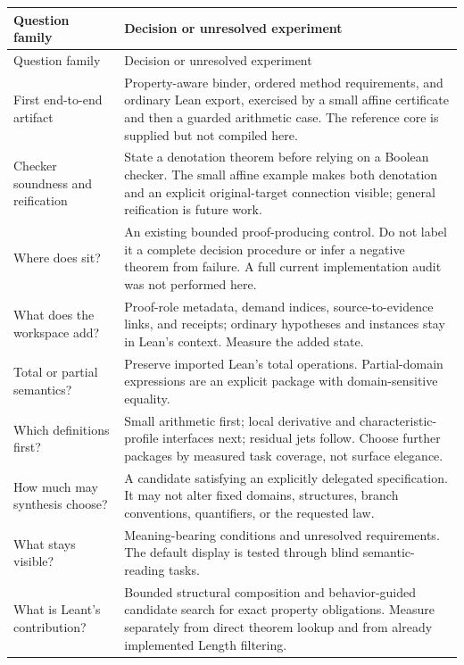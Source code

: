 \documentclass[11pt,a4paper]{article}
\newcommand{\code}[1]{\texttt{\detokenize{#1}}}
\theoremstyle{definition}
\begin{document}
\begin{center}\small
\begin{longtable}{@{}P{42mm}P{111mm}@{}}
\toprule
Question family & Decision or unresolved experiment\\
\midrule\endfirsthead
\toprule Question family & Decision or unresolved experiment\\\midrule\endhead
\bottomrule\endfoot
First end-to-end artifact & Property-aware binder, ordered method requirements,
and ordinary Lean export, exercised by a small affine certificate and then a
guarded arithmetic case. The reference core is supplied but not compiled here.\\
Checker soundness and reification & State a denotation theorem before relying
on a Boolean checker. The small affine example makes both denotation and an
explicit original-target connection visible; general reification is future work.\\
Where does \code{grobner} sit? & An existing bounded proof-producing control.
Do not label it a complete decision procedure or infer a negative theorem from
failure. A full current implementation audit was not performed here.\\
What does the workspace add? & Proof-role metadata, demand indices,
source-to-evidence links, and receipts; ordinary hypotheses and instances stay
in Lean's context. Measure the added state.\\
Total or partial semantics? & Preserve imported Lean's total operations.
Partial-domain expressions are an explicit package with domain-sensitive equality.\\
Which definitions first? & Small arithmetic first; local derivative and
characteristic-profile interfaces next; residual jets follow. Choose further
packages by measured task coverage, not surface elegance.\\
How much may synthesis choose? & A candidate satisfying an explicitly delegated
specification. It may not alter fixed domains, structures, branch conventions,
quantifiers, or the requested law.\\
What stays visible? & Meaning-bearing conditions and unresolved requirements.
The default display is tested through blind semantic-reading tasks.\\
What is Leant's contribution? & Bounded structural composition and behavior-guided
candidate search for exact property obligations. Measure separately from direct
theorem lookup and from already implemented Length filtering.\\

\end{longtable}
\end{center}
\end{document}
